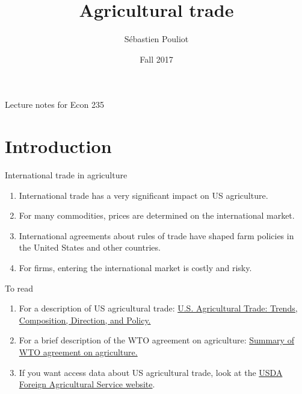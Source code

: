 \documentclass[table,xcolor=pdftex,dvipsnames]{beamer}\usepackage[]{graphicx}\usepackage[]{color}
\title[Agricultural trade]{Agricultural trade}
\author[Pouliot]{S\'{e}bastien Pouliot}
\institute{Iowa State University}
\date{Fall 2017}
\begin{document}

\begin{frame}
\titlepage
\vspace{-0.4in}
\begin{center}
Lecture notes for Econ 235\\
\end{center}
\end{frame}

\section[Introduction]{Introduction}

\begin{frame}{International trade in agriculture}
\begin{enumerate}[label=\textbullet]
  \item International trade has a very significant impact on US agriculture.
  \item For many commodities, prices are determined on the international market.
  \item International agreements about rules of trade have shaped farm policies in the United States and other countries.
  \item For firms, entering the international market is costly and risky.
\end{enumerate}
\end{frame}


\begin{frame}{To read}
\begin{enumerate}[label=\textbullet]
    \item For a description of US agricultural trade: \href{http://www.fas.org/sgp/crs/misc/98-253.pdf}{U.S. Agricultural Trade: Trends, Composition, Direction, and Policy.}
    \item For a brief description of the WTO agreement on agriculture: \href{http://www.wto.org/english/docs_e/legal_e/ursum_e.htm}{Summary of WTO agreement on agriculture.}
    \item If you want access data about US agricultural trade, look at the \href{http://www.fas.usda.gov/psdonline/psdHome.aspx}{USDA Foreign Agricultural Service website}.
\end{enumerate}
\end{frame}
\end{document}
